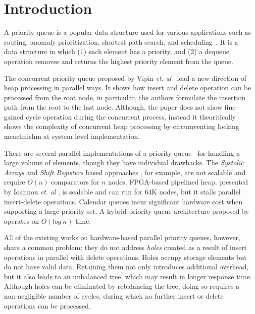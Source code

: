 \section{Introduction}
A priority queue is a popular data structure used for various applications such as routing, anomaly prioritization, shortest path search, and scheduling~\cite{ah1,ah2,ah3}.
It is a data structure in which (1) each element has a priority, and (2) a dequeue operation removes and returns the highest priority element from the queue.

The concurrent priority queue proposed by Vipin {\it et. al}~\cite{pq6} lead a new direction of heap processing in parallel ways. It shows how insert and delete operation can be processed from the root node, in particular, the authors formulate the insertion path from the root to the last node. Although, the paper does not show fine-gained cycle operation during the concurrent process, instead it theoritically shows the complexity of concurrent heap processing by circumventing locking meachnishm at system level implementation.

There are several parallel implementations of a priority queue~\cite{hw1,hw2,hw8,hw9,fpga1,fpga2,fpga3} for handling a large volume of elements, though they have individual drawbacks.
The {\it Systolic Arrays} and {\it Shift Registers} based approaches \cite{hw8,hw9}, for example, are not scalable and require $O(n)$ comparators for $n$ nodes.
FPGA-based pipelined heap, presented by Ioannou {\it et. al} \cite{fpga1}, is scalable and can run for 64K nodes, but it stalls parallel insert-delete operations. Calendar queues \cite{hw1} incur significant hardware cost when supporting a large priority set. A hybrid priority queue architecture proposed by \cite{hwsw1} operates on $O(log \ n)$ time.

All of the existing works on hardware-based parallel priority queues, however, share a common problem: they do not address {\it holes} created as a result of insert operations in parallel with delete operations. 
Holes occupy storage elements but do not have valid data. 
Retaining them not only introduces additional overhead, but it also leads to an unbalanced tree, which may result in longer response time.
Although holes can be eliminated by rebalancing the tree, doing so requires a non-negligible number of cycles, during which no further insert or delete operations can be processed.

